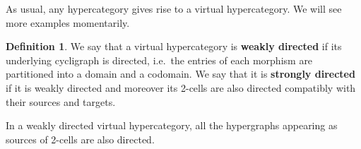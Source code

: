 \documentclass{article}
\theoremstyle{definition}
\newtheorem{defn}[thm]{Definition}
\theoremstyle{remark}
\def\M{\mathbb{M}}
\begin{document}
As usual, any hypercategory gives rise to a virtual hypercategory.
We will see more examples momentarily.



\begin{defn}\label{thm:wk-dir}
  We say that a virtual hypercategory is \textbf{weakly directed} if its underlying cycligraph is directed, i.e.\ the entries of each morphism are partitioned into a domain and a codomain.
  We say that it is \textbf{strongly directed} if it is weakly directed and moreover its 2-cells are also directed compatibly with their sources and targets.
\end{defn}

In a weakly directed virtual hypercategory, all the hypergraphs appearing as sources of 2-cells are also directed.


\end{document}
